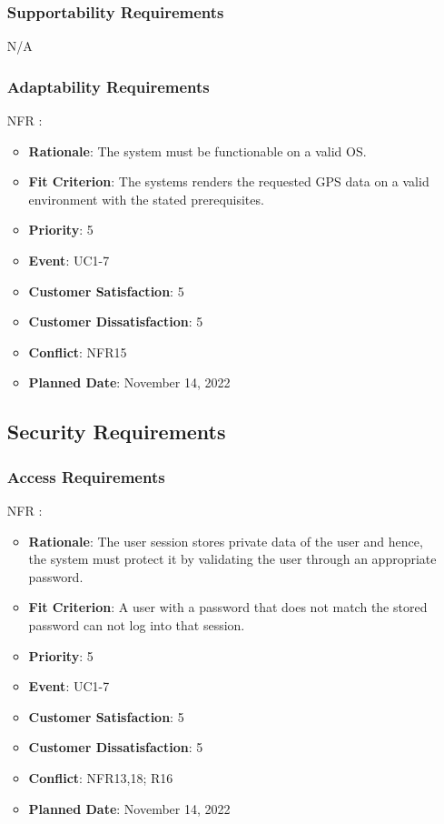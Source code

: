 \documentclass[12pt, titlepage]{article}
\newcounter{reqnum} %
\newcounter{freqnum} %
\begin{document}
\begin{itemize}
\subsubsection{Supportability Requirements}
N/A
\subsubsection{Adaptability Requirements}
\item[NFR\refstepcounter{freqnum}\thefreqnum
\label{NFR}:] 
\begin{itemize}
    \item \textbf{Rationale}: The system must be functionable on a valid OS.
    \item \textbf{Fit Criterion}: The systems renders the requested GPS data on a valid environment with the stated prerequisites.
    \item \textbf{Priority}: 5
    \item \textbf{Event}: UC1-7%
    \item \textbf{Customer Satisfaction}: 5
    \item \textbf{Customer Dissatisfaction}: 5
    \item \textbf{Conflict}: NFR15
    \item \textbf{Planned Date}: November 14, 2022
\end{itemize}
\subsection{Security Requirements}

\subsubsection{Access Requirements}
\item[NFR\refstepcounter{freqnum}\thefreqnum
\label{NFR}:] 
\begin{itemize}
    \item \textbf{Rationale}: The user session stores private data of the user and hence, the system must protect it by validating the user through an appropriate password.
    \item \textbf{Fit Criterion}: A user with a password that does not match the stored password can not log into that session.
    \item \textbf{Priority}: 5
    \item \textbf{Event}: UC1-7%
    \item \textbf{Customer Satisfaction}: 5
    \item \textbf{Customer Dissatisfaction}: 5
    \item \textbf{Conflict}: NFR13,18; R16
    \item \textbf{Planned Date}: November 14, 2022
\end{itemize}

\end{itemize}
\end{document}
